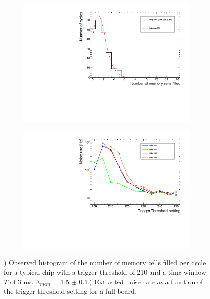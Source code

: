 \begin{figure}[htbp!]
  \centering
  \begin{subfigure}[t]{0.49\textwidth}
    \includegraphics[width=1.\linewidth]{chap4/fig_Commi/NumberMemFilled_Poisson.pdf}
    \caption{} \label{fig:MemPoison}
  \end{subfigure}
  \hfill
  \begin{subfigure}[t]{0.49\textwidth}
    \includegraphics[width=1.\linewidth]{chap4/fig_Commi/NoiseMeasurement_SM1.pdf}
    \caption{} \label{fig:DCRThr}
  \end{subfigure}
  \caption{) Observed histogram of the number of memory cells filled per cycle for a typical chip with a trigger threshold of 210 and a time window $T$ of 3 ms. $\lambda_{mem}$ = 1.5 $\pm$ 0.1.) Extracted noise rate as a function of the trigger threshold setting for a full board.}
\end{figure}


